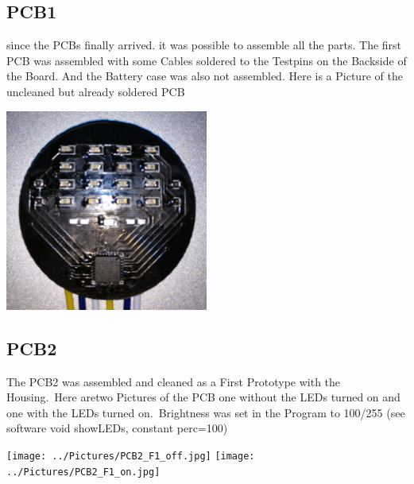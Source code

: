 \documentclass[12pt,a4paper,final]{article}
\begin{document}
\subsection{PCB1}

since the PCBs finally arrived. it was possible to assemble all the parts.
The first PCB was assembled with some Cables soldered to the Testpins on the Backside of the Board.
And the Battery case was also not assembled.
Here is a Picture of the uncleaned but already soldered PCB
\begin{center}
  \includegraphics[width=0.5\textwidth]{../Pictures/PCB1_F1.jpg}
\end{center}

\subsection{PCB2}
The PCB2 was assembled and cleaned as a First Prototype with the Housing.\
Here aretwo Pictures of the PCB one without the LEDs turned on and one with the LEDs turned on.\
Brightness was set in the Program to 100/255 (see software void showLEDs, constant perc=100) 
\begin{center}
\texttt{[image: ../Pictures/PCB2\_F1\_off.jpg]} \texttt{[image: ../Pictures/PCB2\_F1\_on.jpg]}

\end{center}
\end{document}
